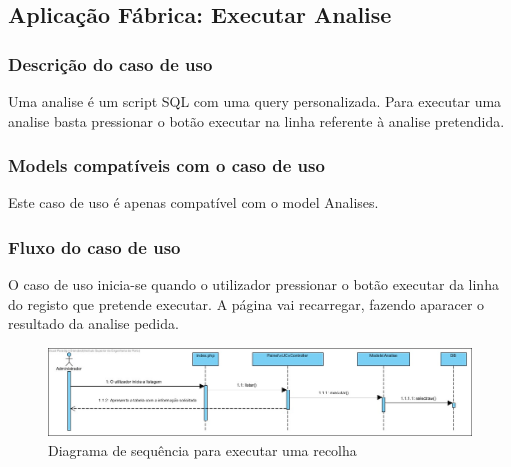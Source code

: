 \subsection{Aplicação Fábrica: Executar Analise}
\subsubsection*{Descrição do caso de uso}
Uma analise é um script SQL com uma query personalizada. Para executar uma analise basta pressionar o botão executar na linha referente à analise pretendida.

\subsubsection*{Models compatíveis com o caso de uso}
Este caso de uso é apenas compatível com o model Analises.

\subsubsection*{Fluxo do caso de uso}
O caso de uso inicia-se quando o utilizador pressionar o botão executar da linha do registo que pretende executar. A página vai recarregar, fazendo aparacer o resultado da analise pedida.


\begin{figure}[H] 
	\begin{center}
		\includegraphics[width=\textwidth,keepaspectratio]{figuras/Diagramas_vp/SD_Painel_7_Executar_Analise.jpg}
		\caption{Diagrama de sequência para executar uma recolha}
		\label{fig:sd_executar analise} 
	\end{center}
\end{figure}